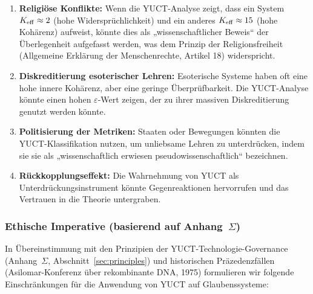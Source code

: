\documentclass[12pt,a4paper]{article}
\newcommand{\eps}{\varepsilon}
\begin{document}
	\begin{enumerate}
		\item \textbf{Religiöse Konflikte:} Wenn die YUCT-Analyse zeigt, dass ein System $\Keff \approx 2$ (hohe Widersprüchlichkeit) und ein anderes $\Keff \approx 15$ (hohe Kohärenz) aufweist, könnte dies als „wissenschaftlicher Beweis“ der Überlegenheit aufgefasst werden, was dem Prinzip der Religionsfreiheit (Allgemeine Erklärung der Menschenrechte, Artikel 18) widerspricht.
		
		\item \textbf{Diskreditierung esoterischer Lehren:} Esoterische Systeme haben oft eine hohe innere Kohärenz, aber eine geringe Überprüfbarkeit. Die YUCT-Analyse könnte einen hohen $\eps$-Wert zeigen, der zu ihrer massiven Diskreditierung genutzt werden könnte.
		
		\item \textbf{Politisierung der Metriken:} Staaten oder Bewegungen könnten die YUCT-Klassifikation nutzen, um unliebsame Lehren zu unterdrücken, indem sie sie als „wissenschaftlich erwiesen pseudowissenschaftlich“ bezeichnen.
		
		\item \textbf{Rückkopplungseffekt:} Die Wahrnehmung von YUCT als Unterdrückungsinstrument könnte Gegenreaktionen hervorrufen und das Vertrauen in die Theorie untergraben.
	\end{enumerate}
	
	\subsubsection{Ethische Imperative (basierend auf Anhang~$\Sigma$)}
	
	In Übereinstimmung mit den Prinzipien der YUCT-Technologie-Governance (Anhang~$\Sigma$, Abschnitt~\ref{sec:principles}) und historischen Präzedenzfällen (Asilomar-Konferenz über rekombinante DNA, 1975) formulieren wir folgende Einschränkungen für die Anwendung von YUCT auf Glaubenssysteme:
	
\end{document}
